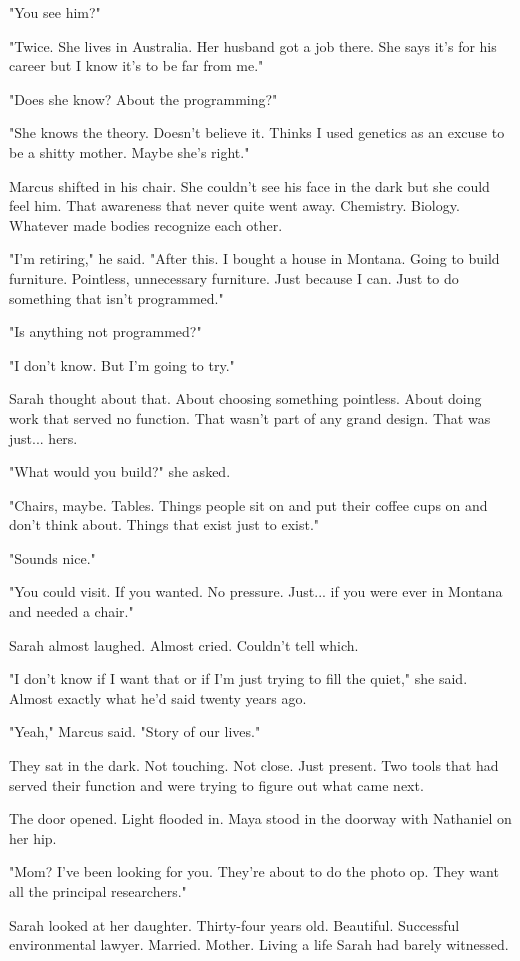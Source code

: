 "You see him?"

"Twice. She lives in Australia. Her husband got a job there. She says it's for his career but I know it's to be far from me."

"Does she know? About the programming?"

"She knows the theory. Doesn't believe it. Thinks I used genetics as an excuse to be a shitty mother. Maybe she's right."

Marcus shifted in his chair. She couldn't see his face in the dark but she could feel him. That awareness that never quite went away. Chemistry. Biology. Whatever made bodies recognize each other.

"I'm retiring," he said. "After this. I bought a house in Montana. Going to build furniture. Pointless, unnecessary furniture. Just because I can. Just to do something that isn't programmed."

"Is anything not programmed?"

"I don't know. But I'm going to try."

Sarah thought about that. About choosing something pointless. About doing work that served no function. That wasn't part of any grand design. That was just... hers.

"What would you build?" she asked.

"Chairs, maybe. Tables. Things people sit on and put their coffee cups on and don't think about. Things that exist just to exist."

"Sounds nice."

"You could visit. If you wanted. No pressure. Just... if you were ever in Montana and needed a chair."

Sarah almost laughed. Almost cried. Couldn't tell which.

"I don't know if I want that or if I'm just trying to fill the quiet," she said. Almost exactly what he'd said twenty years ago.

"Yeah," Marcus said. "Story of our lives."

They sat in the dark. Not touching. Not close. Just present. Two tools that had served their function and were trying to figure out what came next.

The door opened. Light flooded in. Maya stood in the doorway with Nathaniel on her hip.

"Mom? I've been looking for you. They're about to do the photo op. They want all the principal researchers."

Sarah looked at her daughter. Thirty-four years old. Beautiful. Successful environmental lawyer. Married. Mother. Living a life Sarah had barely witnessed.


